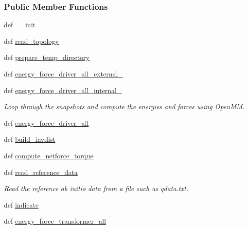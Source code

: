 \subsubsection*{Public Member Functions}
\begin{DoxyCompactItemize}
\item 
def \hyperlink{classforcebalance_1_1openmmio_1_1AbInitio__OpenMM_af5fcee0c4321c7d3024868742a266f7a}{\-\_\-\-\_\-init\-\_\-\-\_\-}
\item 
def \hyperlink{classforcebalance_1_1openmmio_1_1AbInitio__OpenMM_a19b75b06ae4e8cb5a3f5460da101010e}{read\-\_\-topology}
\item 
def \hyperlink{classforcebalance_1_1openmmio_1_1AbInitio__OpenMM_ab8f29ae26dad083efe1c695f52874a88}{prepare\-\_\-temp\-\_\-directory}
\item 
def \hyperlink{classforcebalance_1_1openmmio_1_1AbInitio__OpenMM_a665d40a34e6c4f8eb8af0faeff9aa3cb}{energy\-\_\-force\-\_\-driver\-\_\-all\-\_\-external\-\_\-}
\item 
def \hyperlink{classforcebalance_1_1openmmio_1_1AbInitio__OpenMM_a3aa19af835cfad23b245025adb036bb3}{energy\-\_\-force\-\_\-driver\-\_\-all\-\_\-internal\-\_\-}
\begin{DoxyCompactList}\small\item\em Loop through the snapshots and compute the energies and forces using Open\-M\-M. \end{DoxyCompactList}\item 
def \hyperlink{classforcebalance_1_1openmmio_1_1AbInitio__OpenMM_a0673b350bb0638307875d1a4d153bf34}{energy\-\_\-force\-\_\-driver\-\_\-all}
\item 
def \hyperlink{classforcebalance_1_1abinitio_1_1AbInitio_a7475857193eefd4edd020d4f2a8fec17}{build\-\_\-invdist}
\item 
def \hyperlink{classforcebalance_1_1abinitio_1_1AbInitio_afbf86c26158a68cae7460b4106809fdd}{compute\-\_\-netforce\-\_\-torque}
\item 
def \hyperlink{classforcebalance_1_1abinitio_1_1AbInitio_aa73bedbf1e2cf19f2fa1e88815f1bd86}{read\-\_\-reference\-\_\-data}
\begin{DoxyCompactList}\small\item\em Read the reference ab initio data from a file such as qdata.\-txt. \end{DoxyCompactList}\item 
def \hyperlink{classforcebalance_1_1abinitio_1_1AbInitio_a3260db78e8c174f04a64661c4e5c181c}{indicate}
\item 
def \hyperlink{classforcebalance_1_1abinitio_1_1AbInitio_a3d28520925c6dfd179647d0abf7e1368}{energy\-\_\-force\-\_\-transformer\-\_\-all}

\end{DoxyCompactItemize}
